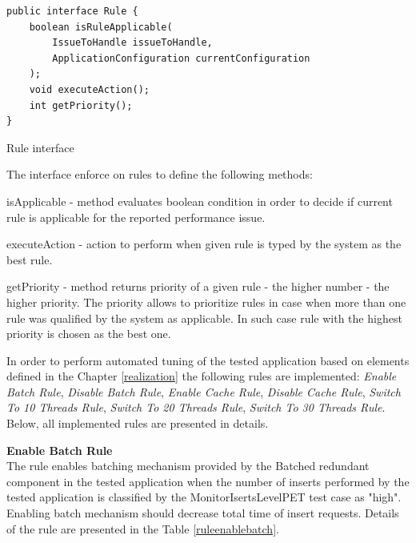 \documentclass[12pt,a4paper]{article}
\let\tempone\itemize
\let\temptwo\enditemize
\renewenvironment{itemize}{\tempone\addtolength{\itemsep}{-0.4\baselineskip}}{\temptwo}
\begin{document}
\begin{listing}[ht]\begin{verbatim}
public interface Rule {
    boolean isRuleApplicable(
    	IssueToHandle issueToHandle, 
    	ApplicationConfiguration currentConfiguration
    );
    void executeAction();
    int getPriority();
}
\end{verbatim}
\caption{Rule interface} \label{irule}
\end{listing}

The interface enforce on rules to define the following methods: 
\begin{itemize}
\item isApplicable - method evaluates boolean condition in order to decide if current rule is applicable for the reported performance issue.   
\item executeAction - action to perform when given rule is typed by the system as the best rule.   
\item getPriority - method returns priority of a given rule - the higher number - the higher priority. The priority allows to prioritize rules in case when more than one rule was qualified by the system as applicable. In such case rule with the highest priority is chosen as the best one. 
\end{itemize}

In order to perform automated tuning of the tested application based on elements defined in the Chapter \ref{realization} the following rules are implemented: \textit{Enable Batch Rule}, \textit{Disable Batch Rule}, \textit{Enable Cache Rule}, \textit{Disable Cache Rule}, \textit{Switch To 10 Threads Rule}, \textit{Switch To 20 Threads Rule}, \textit{Switch To 30 Threads Rule}. Below, all implemented rules are presented in details.  

\vspace{5mm}

\noindent\textbf{Enable Batch Rule} \\
The rule enables batching mechanism provided by the Batched redundant component in the tested application when the number of  inserts performed by the tested application is classified by the MonitorIsertsLevelPET test case as "high". Enabling batch mechanism should decrease total time of insert requests. Details of the rule are presented in the Table \ref{ruleenablebatch}.
\end{document}
